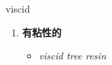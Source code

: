
\begin{frame}
{\huge viscid}
\begin{center}
\begin{enumerate}\Large
  \item \textbf{有粘性的}
  \begin{itemize}
    \item \em{\Large{viscid tree resin}}
  \end{itemize}
\end{enumerate}
\end{center}
\end{frame}
